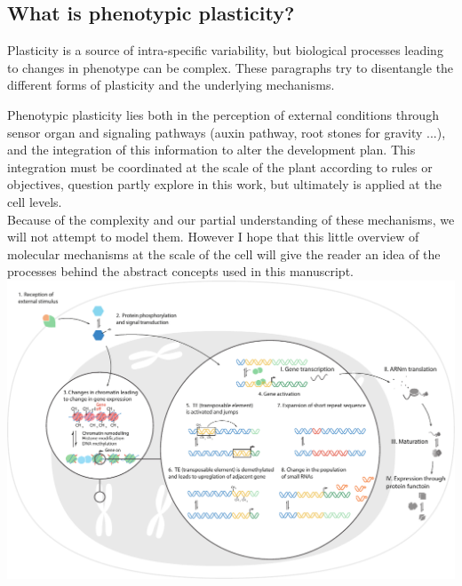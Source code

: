 \subsection{What is phenotypic plasticity?}

Plasticity is a source of intra-specific variability, but biological processes leading to changes in phenotype can be complex. These paragraphs try to disentangle the different forms of plasticity and the underlying mechanisms.

\begin{fullwidth}
\begin{tcolorbox}[title=Molecular basis of phenotypic plasticity] %
Phenotypic plasticity lies both in the perception of external conditions through sensor organ and signaling pathways (auxin pathway, root stones for gravity ...), and the integration of this information to alter the development plan. This integration must be coordinated at the scale of the plant according to rules or objectives, question partly explore in this work, but ultimately is applied at the cell levels.\\
\indent Because of the complexity and our partial understanding of these mechanisms, we will not attempt to model them. However I hope that this little overview of molecular mechanisms at the scale of the cell will give the reader an idea of the processes behind the abstract concepts used in this manuscript.\\

    \includegraphics[width=1\linewidth]{./1_Introduction/graphics/molecular_basis.pdf}
  

\end{tcolorbox}
\end{fullwidth}
